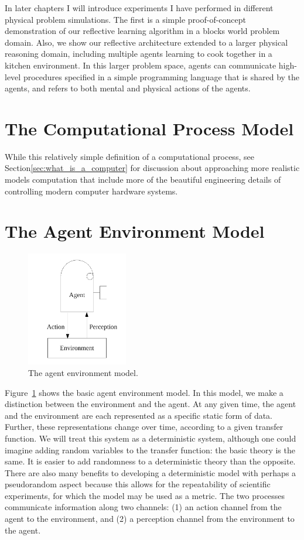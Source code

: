 In later chapters I will introduce experiments I have performed in
different physical problem simulations.  The first is a simple
proof-of-concept demonstration of our reflective learning algorithm in
a blocks world problem domain.  Also, we show our reflective
architecture extended to a larger physical reasoning domain, including
multiple agents learning to cook together in a kitchen environment.
In this larger problem space, agents can communicate high-level
procedures specified in a simple programming language that is shared
by the agents, and refers to both mental and physical actions of the
agents.

\section{The Computational Process Model}
\label{sec:computational_process_model}

While this relatively simple definition of a computational process,
see Section\ref{sec:what_is_a_computer} for discussion about
approaching more realistic models computation that include more of the
beautiful engineering details of controlling modern computer hardware
systems.

\section{The Agent Environment Model}

\begin{figure}[bth]
  \center
  \includegraphics[height=5cm]{gfx/agent_environment}
  \caption[The agent environment model]{The agent environment model.}
  \label{fig:agent_environment}
\end{figure}

Figure~\ref{fig:agent_environment} shows the basic agent environment
model.  In this model, we make a distinction between the environment
and the agent.  At any given time, the agent and the environment are
each represented as a specific static form of data.  Further, these
representations change over time, according to a given transfer
function.  We will treat this system as a deterministic system,
although one could imagine adding random variables to the transfer
function: the basic theory is the same.  It is easier to add
randomness to a deterministic theory than the opposite.  There are
also many benefits to developing a deterministic model with perhaps a
pseudorandom aspect because this allows for the repeatability of
scientific experiments, for which the model may be used as a metric.
The two processes communicate information along two channels: (1) an
action channel from the agent to the environment, and (2) a perception
channel from the environment to the agent.

